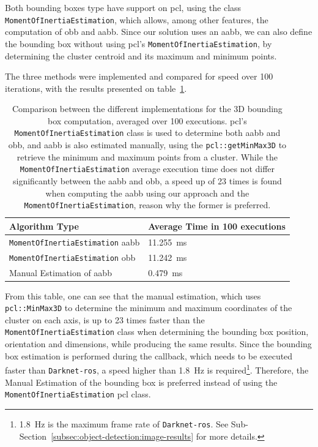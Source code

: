Both bounding boxes type have support on \ac{pcl}, using the class \texttt{MomentOfInertiaEstimation}, which allows, among other features, the computation of \ac{obb} and \ac{aabb}. Since our solution uses an \ac{aabb}, we can also define the bounding box without using \ac{pcl}'s \texttt{MomentOfInertiaEstimation}, by determining the cluster centroid and its maximum and minimum points.

The three methods were implemented and compared for speed over 100 iterations, with the results presented on table~\ref{tab:bounding-box-estimation-times}.

\begin{table}[H]
	\centering
	\renewcommand{\arraystretch}{1.2}
	\begin{tabular}{@{}p{8cm}l@{}}
		\toprule
		Algorithm Type & Average Time in 100 executions \\
		\midrule
		\texttt{MomentOfInertiaEstimation} \ac{aabb} & \SI{11.255}{\milli\second} \\
		\texttt{MomentOfInertiaEstimation} \ac{obb} & \SI{11.242}{\milli\second} \\
		Manual Estimation of \ac{aabb}& \SI{0.479}{\milli\second} \\
		\bottomrule
	\end{tabular}
	\caption{Comparison between the different implementations for the 3D bounding box computation, averaged over 100 executions. \ac{pcl}'s \texttt{MomentOfInertiaEstimation} class is used to determine both \ac{aabb} and \ac{obb}, and \ac{aabb} is also estimated manually, using the \texttt{pcl::getMinMax3D} to retrieve the minimum and maximum points from a cluster. While the \texttt{MomentOfInertiaEstimation} average execution time does not differ significantly between the \ac{aabb} and \ac{obb}, a speed up of 23 times is found when computing the \ac{aabb} using our approach and the \texttt{MomentOfInertiaEstimation}, reason why the former is preferred.} 
	\label{tab:bounding-box-estimation-times}
\end{table}

From this table, one can see that the manual estimation, which uses \texttt{pcl::MinMax3D} to determine the minimum and maximum coordinates of the cluster on each axis, is up to 23 times faster than the \texttt{MomentOfInertiaEstimation} class when determining the bounding box position, orientation and dimensions, while producing the same results. Since the bounding box estimation is performed during the callback, which needs to be executed faster than \texttt{Darknet-ros}, a speed higher than \SI{1.8}{\hertz} is required\footnote{\SI{1.8}{\hertz} is the maximum frame rate of \texttt{Darknet-ros}. See Sub-Section~\ref{subsec:object-detection:image-results} for more details.}. Therefore, the Manual Estimation of the bounding box is preferred instead of using the \texttt{MomentOfInertiaEstimation} \ac{pcl} class.

